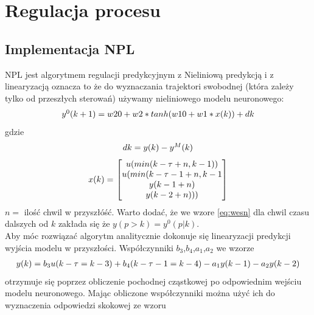 \chapter{Regulacja procesu}
	\label{ch:reg}
	
	\section{Implementacja NPL}
		\label{sec:NPL}
		NPL jest algorytmem regulacji predykcyjnym z Nieliniową predykcją i z linearyzacją oznacza to że do wyznaczania trajektori swobodnej (która zależy tylko od przeszłych sterowań) używamy nieliniowego modelu neuronowego:
		\begin{equation}
		\begin{tabular}{l}
		$y^0(k+1)=w20+w2*tanh(w10+w1*x(k))+dk$
		\end{tabular}
		\label{eq:NPL_y0}
		\end{equation}
		gdzie
		\begin{equation}
		\begin{tabular}{l}
		$dk = y(k)-y^M(k)$
		\end{tabular}
		\label{eq:dk}
		\end{equation}
		\begin{equation}
		\begin{tabular}{l}
		$x(k)=$ $\begin{bmatrix}u(min(k-\tau+n,k-1))\\u(min(k-\tau-1+n,k-1\\y(k-1+n)\\y(k-2+n)))\end{bmatrix}$
		\end{tabular}
		\label{eq:wesn}
		\end{equation}
		$n=$ ilość chwil w przyszłóść.
		Warto dodać, że we wzore \ref{eq:wesn} dla chwil czasu dalszych od $k$ zakłada się że $y(p>k)=y^0(p|k)$.\\
		Aby móc rozwiązać algorytm analitycznie dokonuje się linearyzacji predykcji wyjścia modelu w przyszłości. Współczynniki $b_3$,$b_4$,$a_1$,$a_2$ we wzorze
		\begin{equation}
		\begin{tabular}{l}
		$y(k)=b_3u(k-\tau=k-3)+b_4(k-\tau-1=k-4)-a_1y(k-1)-a_2y(k-2)$
		\end{tabular}
		\label{eq:NPL_wyjscielinear}
		\end{equation}
		otrzymuje się poprzez obliczenie pochodnej cząstkowej po odpowiednim wejściu modelu neuronowego. Mając obliczone współczynniki można użyć ich do wyznaczenia odpowiedzi skokowej ze wzoru
